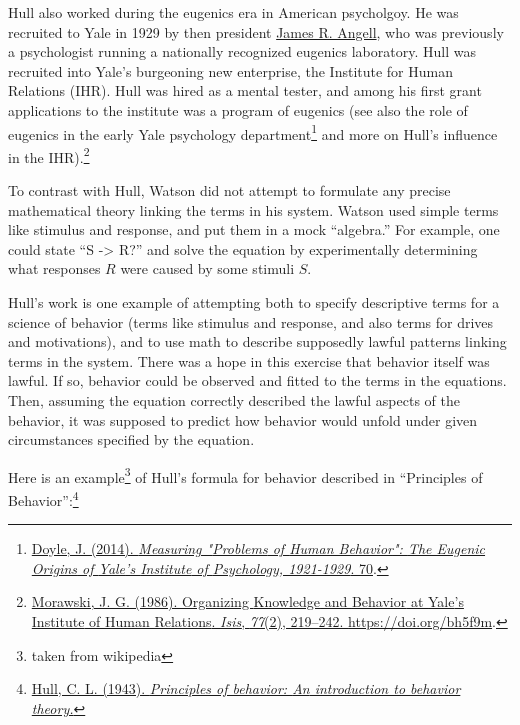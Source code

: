 \documentclass[
  oneside,
  12pt]{crumpbook}
\newenvironment{floatrightbox50}{%
  \wrapfigure{R}{.5\textwidth}%
  }{%
  \endwrapfigure}
\begin{document}
\begin{floatrightbox50}
Hull also worked during the eugenics era in American psycholgoy. He was recruited to Yale in 1929 by then president \href{https://en.wikipedia.org/wiki/James_Rowland_Angell}{James R. Angell}, who was previously a psychologist running a nationally recognized eugenics laboratory. Hull was recruited into Yale's burgeoning new enterprise, the Institute for Human Relations (IHR). Hull was hired as a mental tester, and among his first grant applications to the institute was a program of eugenics (see also the role of eugenics in the early Yale psychology department\footnote{\protect\hyperlink{ref-doyleMeasuringProblemsHuman2014}{Doyle, J. (2014). \emph{Measuring "{Problems} of {Human Behavior}": {The Eugenic Origins} of {Yale}'s {Institute} of {Psychology}, 1921-1929}. 70}.} and more on Hull's influence in the IHR).\footnote{\protect\hyperlink{ref-morawskiOrganizingKnowledgeBehavior1986}{Morawski, J. G. (1986). Organizing {Knowledge} and {Behavior} at {Yale}'s {Institute} of {Human Relations}. \emph{Isis}, \emph{77}(2), 219--242. \url{https://doi.org/bh5f9m}}.}

\end{floatrightbox50}

To contrast with Hull, Watson did not attempt to formulate any precise mathematical theory linking the terms in his system. Watson used simple terms like stimulus and response, and put them in a mock ``algebra.'' For example, one could state ``S -\textgreater{} R?'' and solve the equation by experimentally determining what responses \(R\) were caused by some stimuli \(S\).

Hull's work is one example of attempting both to specify descriptive terms for a science of behavior (terms like stimulus and response, and also terms for drives and motivations), and to use math to describe supposedly lawful patterns linking terms in the system. There was a hope in this exercise that behavior itself was lawful. If so, behavior could be observed and fitted to the terms in the equations. Then, assuming the equation correctly described the lawful aspects of the behavior, it was supposed to predict how behavior would unfold under given circumstances specified by the equation.

Here is an example\footnote{taken from wikipedia} of Hull's formula for behavior described in ``Principles of Behavior'':\footnote{\protect\hyperlink{ref-hullPrinciplesBehaviorIntroduction1943}{Hull, C. L. (1943). \emph{Principles of behavior: {An} introduction to behavior theory.}}}
\end{document}
